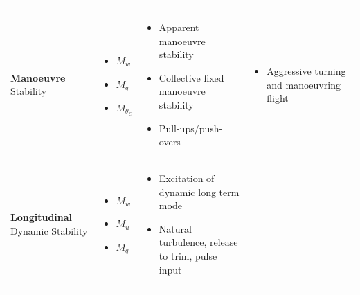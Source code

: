 \documentclass[
]{book}
\providecommand{\tightlist}{%
  \setlength{\itemsep}{0pt}\setlength{\parskip}{0pt}}
\begin{document}
\begin{longtable}[]{@{}llll@{}}
\begin{minipage}[t]{0.33\columnwidth}
\begin{itemize}
\end{itemize}\strut
\end{minipage}\tabularnewline
\begin{minipage}[t]{0.16\columnwidth}\raggedright
\textbf{Manoeuvre}
Stability\strut
\end{minipage} & \begin{minipage}[t]{0.14\columnwidth}\raggedright
\begin{itemize}
\tightlist
\item
  \(M_w\)
\item
  \(M_q\)
\item
  \(M_{\theta_C}\)
\end{itemize}\strut
\end{minipage} & \begin{minipage}[t]{0.27\columnwidth}\raggedright
\begin{itemize}
\tightlist
\item
  Apparent manoeuvre stability
\item
  Collective fixed manoeuvre stability
\item
  Pull-ups/push-overs
\end{itemize}\strut
\end{minipage} & \begin{minipage}[t]{0.33\columnwidth}\raggedright
\begin{itemize}
\tightlist
\item
  Aggressive turning and manoeuvring flight
\end{itemize}\strut
\end{minipage}\tabularnewline
\begin{minipage}[t]{0.16\columnwidth}\raggedright
\textbf{Longitudinal}
Dynamic Stability\strut
\end{minipage} & \begin{minipage}[t]{0.14\columnwidth}\raggedright
\begin{itemize}
\tightlist
\item
  \(M_w\)
\item
  \(M_u\)
\item
  \(M_q\)
\end{itemize}\strut
\end{minipage} & \begin{minipage}[t]{0.27\columnwidth}\raggedright
\begin{itemize}
\tightlist
\item
  Excitation of dynamic long term mode
\item
  Natural turbulence, release to trim, pulse input

\end{itemize}
\end{minipage}
\end{longtable}
\end{document}
